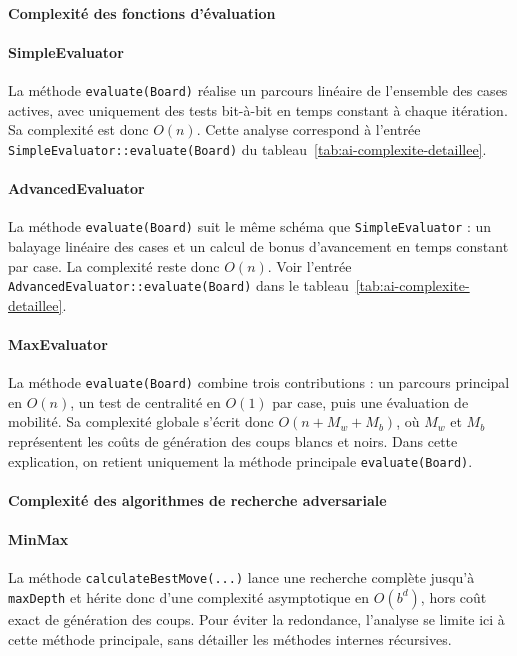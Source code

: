 \documentclass[a4paper]{article}
\begin{document}
\paragraph{Complexité des fonctions d'évaluation}

\paragraph{SimpleEvaluator}
La méthode \texttt{evaluate(Board)} réalise un parcours linéaire de l'ensemble des cases actives,
avec uniquement des tests bit-à-bit en temps constant à chaque itération. Sa complexité est donc $O(n)$.
Cette analyse correspond à l'entrée \texttt{SimpleEvaluator::evaluate(Board)} du tableau~\ref{tab:ai-complexite-detaillee}.

\paragraph{AdvancedEvaluator}
La méthode \texttt{evaluate(Board)} suit le même schéma que \texttt{SimpleEvaluator} : un balayage linéaire des cases
et un calcul de bonus d'avancement en temps constant par case. La complexité reste donc $O(n)$.
Voir l'entrée \texttt{AdvancedEvaluator::evaluate(Board)} dans le tableau~\ref{tab:ai-complexite-detaillee}.

\paragraph{MaxEvaluator}
La méthode \texttt{evaluate(Board)} combine trois contributions : un parcours principal en $O(n)$,
un test de centralité en $O(1)$ par case, puis une évaluation de mobilité.
Sa complexité globale s'écrit donc $O(n + M_{w} + M_{b})$, où $M_{w}$ et $M_{b}$ représentent les coûts
de génération des coups blancs et noirs.
Dans cette explication, on retient uniquement la méthode principale \texttt{evaluate(Board)}.

\paragraph{Complexité des algorithmes de recherche adversariale}

\paragraph{MinMax}
La méthode \texttt{calculateBestMove(...)} lance une recherche complète jusqu'à \texttt{maxDepth} et hérite donc
d'une complexité asymptotique en $O(b^d)$, hors coût exact de génération des coups.
Pour éviter la redondance, l'analyse se limite ici à cette méthode principale,
sans détailler les méthodes internes récursives.
\end{document}
